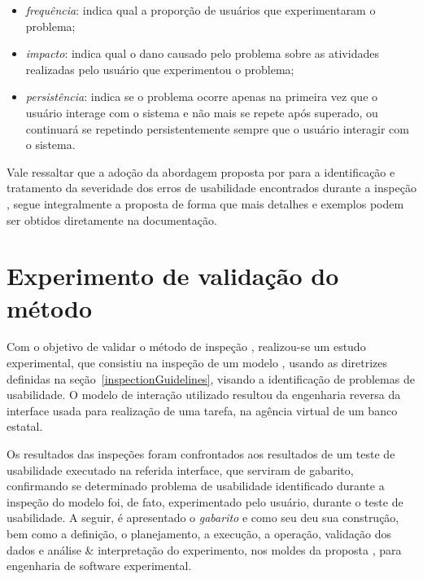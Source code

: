 \begin{itemize}

  \item  {\em frequência}:  indica qual  a proporção  de  usuários que
    experimentaram o problema;

  \item {\em impacto}: indica qual  o dano causado pelo problema sobre
    as atividades realizadas pelo usuário que experimentou o problema;

  \item  {\em persistência}:  indica se  o problema  ocorre  apenas na
    primeira vez  que o usuário interage  com o sistema e  não mais se
    repete após superado,  ou continuará se repetindo persistentemente
    sempre que o usuário interagir com o sistema.

\end{itemize}

Vale   ressaltar   que   a    adoção   da   abordagem   proposta   por
    para   a    identificação   e
tratamento da severidade dos  erros de usabilidade encontrados durante
a inspeção \aladim,  segue integralmente a proposta de  forma que mais
detalhes e exemplos podem ser obtidos diretamente na documentação.

\section{Experimento de validação do método}
\label{evaluation}

Com o objetivo de validar o método de inspeção \aladim, realizou-se um
estudo experimental,  que consistiu na inspeção de  um modelo \aladim,
usando  as diretrizes  definidas  na seção~\ref{inspectionGuidelines},
visando  a identificação  de problemas  de usabilidade.   O  modelo de
interação utilizado resultou da  engenharia reversa da interface usada
para realização de uma tarefa, na agência virtual de um banco estatal.

Os resultados  das inspeções foram  confrontados aos resultados  de um
teste de usabilidade executado  na referida interface, que serviram de
gabarito,   confirmando  se   determinado   problema  de   usabilidade
identificado durante a inspeção  do modelo foi, de fato, experimentado
pelo usuário, durante o teste de usabilidade.  A seguir, é apresentado
o {\em gabarito} e como seu  deu sua construção, bem como a definição,
o planejamento, a execução, a  operação, validação dos dados e análise
\&   interpretação   do    experimento,   nos   moldes   da   proposta
,    para    engenharia    de    software
experimental.

